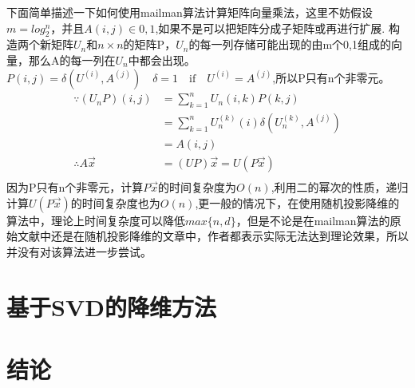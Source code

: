 \documentclass{ctexart}
\begin{document}
    下面简单描述一下如何使用mailman算法计算矩阵向量乘法，这里不妨假设$ m = log_2^n$，并且$A(i,j) \in {0,1}$,如果不是可以把矩阵分成子矩阵或再进行扩展.
    构造两个新矩阵$U_{n}$和$n \times n$的矩阵P，$U_{n}$的每一列存储可能出现的由m个{0,1}组成的向量，那么A的每一列在$U_{n}$中都会出现。$P(i,j) = \delta(U^{(i)},A^{(j)})\quad \delta = 1 \quad \text{if} \quad U^{(i)} = A^{(j)}$,所以P只有n个非零元。
    \begin{align*}
    \because (U_{n}P)(i,j) &=\sum_{k=1}^n U_{n}(i,k)P(k,j)\\
    &=\sum_{k=1}^n U_{n}^{(k)}(i)\delta (U_{n}^{(k)},A^{(j)})\\
    &=A(i,j)\\
    \therefore A\vec{x} &=(UP)\vec{x} = U(P\vec{x})\\
    \end{align*}
    因为P只有n个非零元，计算$P\vec{x}$的时间复杂度为$O(n)$,利用二的幂次的性质，递归计算$U(P\vec{x})$的时间复杂度也为$O(n)$,更一般的情况下，在使用随机投影降维的算法中，理论上时间复杂度可以降低$max\{n,d\}$，但是不论是在mailman算法的原始文献中还是在随机投影降维的文章中，作者都表示实际无法达到理论效果，所以并没有对该算法进一步尝试。


    \section{基于SVD的降维方法}
    \label{sec:svdsec}


    \section{结论}

\nocite{*} %


\end{document}
